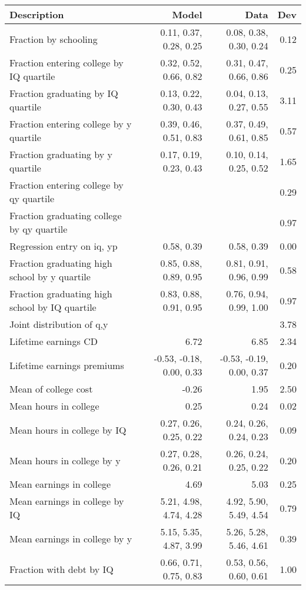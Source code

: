 \begin{tabular}{lrrr}
\hline
Description & Model  & Data  & Dev  \\ 
\hline
Fraction by schooling & 0.11, 0.37, 0.28, 0.25  & 0.08, 0.38, 0.30, 0.24  & 0.12  \\ 
Fraction entering college by IQ quartile & 0.32, 0.52, 0.66, 0.82  & 0.31, 0.47, 0.66, 0.86  & 0.25  \\ 
Fraction graduating by IQ quartile & 0.13, 0.22, 0.30, 0.43  & 0.04, 0.13, 0.27, 0.55  & 3.11  \\ 
Fraction entering college by y quartile & 0.39, 0.46, 0.51, 0.83  & 0.37, 0.49, 0.61, 0.85  & 0.57  \\ 
Fraction graduating by y quartile & 0.17, 0.19, 0.23, 0.43  & 0.10, 0.14, 0.25, 0.52  & 1.65  \\ 
Fraction entering college by qy quartile &   &   & 0.29  \\ 
Fraction graduating college by qy quartile &   &   & 0.97  \\ 
Regression entry on iq, yp & 0.58, 0.39  & 0.58, 0.39  & 0.00  \\ 
Fraction graduating high school by y quartile & 0.85, 0.88, 0.89, 0.95  & 0.81, 0.91, 0.96, 0.99  & 0.58  \\ 
Fraction graduating high school by IQ quartile & 0.83, 0.88, 0.91, 0.95  & 0.76, 0.94, 0.99, 1.00  & 0.97  \\ 
Joint distribution of q,y &   &   & 3.78  \\ 
Lifetime earnings CD & 6.72  & 6.85  & 2.34  \\ 
Lifetime earnings premiums & -0.53, -0.18, 0.00, 0.33  & -0.53, -0.19, 0.00, 0.37  & 0.20  \\ 
Mean of college cost & -0.26  & 1.95  & 2.50  \\ 
Mean hours in college & 0.25  & 0.24  & 0.02  \\ 
Mean hours in college by IQ & 0.27, 0.26, 0.25, 0.22  & 0.24, 0.26, 0.24, 0.23  & 0.09  \\ 
Mean hours in college by y & 0.27, 0.28, 0.26, 0.21  & 0.26, 0.24, 0.25, 0.22  & 0.20  \\ 
Mean earnings in college & 4.69  & 5.03  & 0.25  \\ 
Mean earnings in college by IQ & 5.21, 4.98, 4.74, 4.28  & 4.92, 5.90, 5.49, 4.54  & 0.79  \\ 
Mean earnings in college by y & 5.15, 5.35, 4.87, 3.99  & 5.26, 5.28, 5.46, 4.61  & 0.39  \\ 
Fraction with debt by IQ & 0.66, 0.71, 0.75, 0.83  & 0.53, 0.56, 0.60, 0.61  & 1.00  \\ 

\end{tabular}
